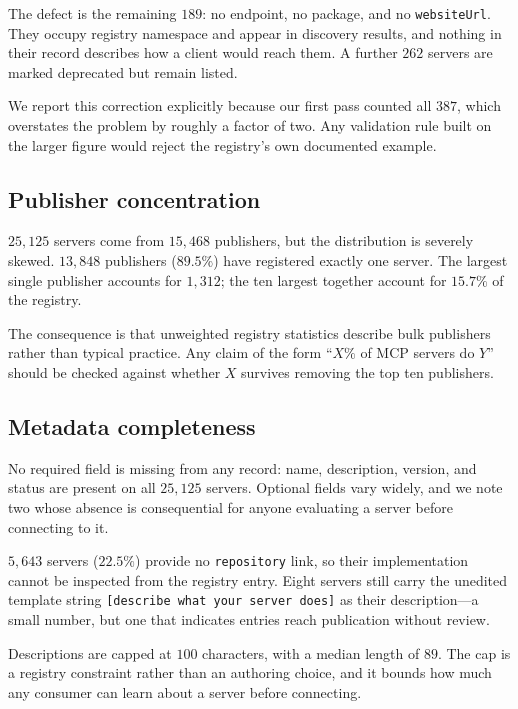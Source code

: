\documentclass[11pt]{article}
\begin{document}
The defect is the remaining $189$: no endpoint, no package, and no
\texttt{websiteUrl}. They occupy registry namespace and appear in discovery
results, and nothing in their record describes how a client would reach them.
A further $262$ servers are marked deprecated but remain listed.

We report this correction explicitly because our first pass counted all $387$,
which overstates the problem by roughly a factor of two. Any validation rule
built on the larger figure would reject the registry's own documented example.

\subsection{Publisher concentration}

$25{,}125$ servers come from $15{,}468$ publishers, but the distribution is
severely skewed. $13{,}848$ publishers ($89.5\%$) have registered exactly one
server. The largest single publisher accounts for $1{,}312$; the ten largest
together account for $15.7\%$ of the registry.

The consequence is that unweighted registry statistics describe bulk
publishers rather than typical practice. Any claim of the form ``$X\%$ of MCP
servers do $Y$'' should be checked against whether $X$ survives removing the
top ten publishers.

\subsection{Metadata completeness}

No required field is missing from any record: name, description, version, and
status are present on all $25{,}125$ servers. Optional fields vary widely, and
we note two whose absence is consequential for anyone evaluating a server
before connecting to it.

$5{,}643$ servers ($22.5\%$) provide no \texttt{repository} link, so their
implementation cannot be inspected from the registry entry. Eight servers still
carry the unedited template string \texttt{[describe what your server does]} as
their description---a small number, but one that indicates entries reach
publication without review.

Descriptions are capped at $100$ characters, with a median length of $89$. The
cap is a registry constraint rather than an authoring choice, and it bounds how
much any consumer can learn about a server before connecting.
\end{document}
